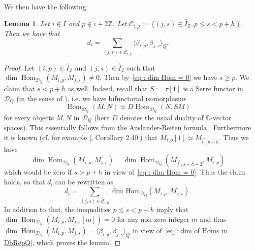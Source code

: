 \documentclass[12pt]{amsart}
\theoremstyle{plain}
\newtheorem{lemma}[theorem]{Lemma}
\theoremstyle{definition}
\numberwithin{equation}{section}
\DeclareMathOperator{\Hom}{Hom}
\newcommand{\IZ}{\widehat{I}_{\mathbb{Z}}}
\newcommand{\DQ}{\mathcal{D}_Q}
\begin{document}
We then have the following:
  \begin{lemma} \label{lem : cone of morphisms}
 Let $i \in I$ and $p \in i + 2 \mathbb{Z}$. Let $ \mathcal{C}_{i,p} :=\{ (j,s) \in \IZ, p \leq s < p+h \ \} $.
 Then we have that 
 $$ d_i = \sum_{(j,s) \in \mathcal{C}_{i,p}} \langle \beta_{i,p} , \beta_{j,s} \rangle_Q . $$
  \end{lemma}

 \begin{proof}
Let $(i,p) \in \IZ$ and  $(j,s) \in \IZ$ such that $\dim \Hom_{\DQ}(M_{i,p},M_{j,s}) \neq 0$. Then by~\eqref{eq : dim Hom = 0} we have  $s \geq p$. We claim that  $s<p+h$ as well. Indeed, recall that    $S := \tau [1]$ is a Serre functor in $\DQ$ (in the sense of \cite{BonOr01}), i.e. we have bifunctorial isomorphisms 
$$ \Hom_{\DQ}(M,N) \simeq D \Hom_{\DQ}(N,SM) $$
for every objects $M,N$ in $\DQ$ (here $D$ denotes the usual duality of $\mathbb{C}$-vector spaces). This essentially follows from the Auslander-Reiten formula  \cite{AR75}.  Furthermore it is known  (cf. for example [\cite{fujita2021q}, Corollary 2.40]) that $ M_{i,p}[1] \simeq M_{i^*,p+h}$. Thus we have 
$$\dim \Hom_{\DQ}(M_{i,p}, M_{j,s}) = \dim \Hom_{\DQ}(M_{j^* , s-h+2} , M_{i,p})$$
which would be zero if $s>p+h$ in view of~\eqref{eq : dim Hom = 0}. Thus the claim holds, so that $d_i$ can be rewritten as 
$$ d_i = \sum_{(j,s) \in \mathcal{C}_{i,p}} \dim \mathrm{Hom}_{\DQ}(M_{i,p},M_{j,s}) .  $$
In addition to that, the inequalities $p \leq s < p+h$ imply that  $\dim \Hom_{\DQ}(M_{i,p} , M_{j,s}[m]) = 0$ for any non zero integer $m$ and thus $\dim \Hom_{\DQ}(M_{i,p} , M_{j,s}) = \langle \beta_{i,p} , \beta_{j,s} \rangle_Q$ in view of~\eqref{eq : dim of Homs in DbRepQ}, which proves the lemma. 




\end{proof}
\end{document}
